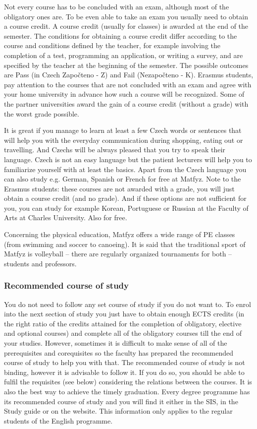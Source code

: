 Not every course has to be concluded with an exam, although most of the
obligatory ones are. To be even able to take an exam you usually need to obtain
a course credit.
A course credit (usually for classes) is awarded at the end of the semester. The
conditions for obtaining a course credit differ according to the course and
conditions defined by the teacher, for example involving the completion of a
test, programming an application, or writing a survey, and are specified by the
teacher at the beginning of the semester. The possible outcomes are Pass (in
Czech Započteno - Z) and Fail (Nezapočteno - K).
Erasmus students, pay attention to the courses that are not concluded with an
exam and agree with your home university in advance how such a course will be
recognized. Some of the partner universities award the gain of a course credit
(without a grade) with the worst grade possible.

It is great if you manage to learn at least a few Czech words or sentences that
will help you with the everyday communication during shopping, eating out or
travelling. And Czechs will be always pleased that you try to speak their
language.
Czech is not an easy language but the patient lecturers will help you to
familiarize yourself with at least the basics.
Apart from the Czech language you can also study e.g. German, Spanish or French
for free at Matfyz. Note to the Erasmus students: these courses are not awarded
with a grade, you will just obtain a course credit (and no grade).
And if these options are not sufficient for you, you can study for example
Korean, Portuguese or Russian at the Faculty of Arts at Charles University. Also
for free.

Concerning the physical education, Matfyz offers a wide range of PE classes
(from swimming and soccer to canoeing). It is said that the traditional sport of
Matfyz is volleyball -- there are regularly organized tournaments for both
-- students and professors.

\subsubsection{Recommended course of study}
You do not need to follow any set course of study if you do not want to. To
enrol into the next section of study you just have to obtain enough ECTS credits
(in the right ratio of the credits attained for the completion of obligatory,
elective and optional courses) and complete all of the obligatory courses till
the end of your studies.
However, sometimes it is difficult to make sense of all of the prerequisites and
corequisites so the faculty has prepared the recommended course of study to help
you with that.
The recommended course of study is not binding, however it is advisable to
follow it. If you do so, you should be able to fulfil the requisites (see below)
considering the relations between the courses. It is also the best way to
achieve the timely graduation.
Every degree programme has its recommended course of study and you will find it
either in the SIS, in the Study guide or on the website. This information only
applies to the regular students of the English programme.

